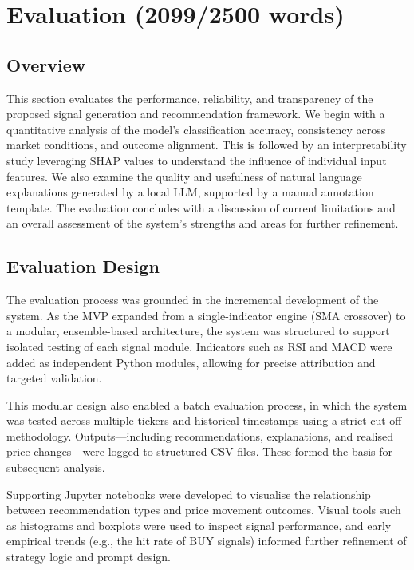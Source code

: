 \section{Evaluation (2099/2500 words)}

\subsection{Overview}

This section evaluates the performance, reliability, and transparency of the proposed signal generation and recommendation framework. We begin with a quantitative analysis of the model’s classification accuracy, consistency across market conditions, and outcome alignment. This is followed by an interpretability study leveraging SHAP values to understand the influence of individual input features. We also examine the quality and usefulness of natural language explanations generated by a local LLM, supported by a manual annotation template. The evaluation concludes with a discussion of current limitations and an overall assessment of the system’s strengths and areas for further refinement.

\subsection{Evaluation Design}
The evaluation process was grounded in the incremental development of the system. As the MVP expanded from a single-indicator engine (SMA crossover) to a modular, ensemble-based architecture, the system was structured to support isolated testing of each signal module. Indicators such as RSI and MACD were added as independent Python modules, allowing for precise attribution and targeted validation.

This modular design also enabled a batch evaluation process, in which the system was tested across multiple tickers and historical timestamps using a strict cut-off methodology. Outputs—including recommendations, explanations, and realised price changes—were logged to structured CSV files. These formed the basis for subsequent analysis.

Supporting Jupyter notebooks were developed to visualise the relationship between recommendation types and price movement outcomes. Visual tools such as histograms and boxplots were used to inspect signal performance, and early empirical trends (e.g., the hit rate of BUY signals) informed further refinement of strategy logic and prompt design.

